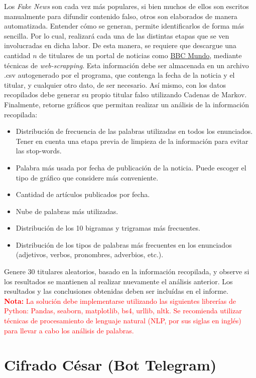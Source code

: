 Los \textit{Fake News} son cada vez más populares, si bien muchos de ellos son escritos manualmente para difundir contenido falso, otros son elaborados de manera automatizada. Entender cómo se generan, permite identificarlos de forma más sencilla. Por lo cual, realizará cada una de las distintas etapas que se ven involucradas en dicha labor. 
De esta manera, se requiere que descargue una cantidad $n$ de titulares de un portal de noticias como \textcolor{cyan}{\href{https://www.bbc.com/mundo/topics/c67q9nnn8z7t}{BBC Mundo}}, mediante técnicas de \textit{web-scrapping}. Esta información debe ser almacenada en un archivo .csv autogenerado por el programa, que contenga la fecha de la noticia y el titular, y cualquier otro dato, de ser necesario. Así mismo, con los datos recopilados debe generar su propio titular falso utilizando Cadenas de Markov. Finalmente, retorne gráficos que permitan realizar un análisis de la información recopilada:
\begin{itemize}
    \item Distribución de frecuencia de las palabras utilizadas en todos los enunciados. Tener en cuenta una etapa previa de limpieza de la información para evitar las stop-words.
    \item Palabra más usada por fecha de publicación de la noticia. Puede escoger el tipo de gráfico que considere más conveniente.
    \item Cantidad de artículos publicados por fecha.
    \item Nube de palabras más utilizadas.
    \item Distribución de los 10 bigramas y trigramas más frecuentes.
    \item Distribución de los tipos de palabras más frecuentes en los enunciados (adjetivos, verbos, pronombres, adverbios, etc.).
\end{itemize}
Genere 30 titulares aleatorios, basado en la información recopilada, y observe si los resultados se mantienen al realizar nuevamente el análisis anterior. Los resultados y las conclusiones obtenidas deben ser incluídas en el informe.
\\

\textcolor{red}{\textbf{Nota:} La solución debe implementarse utilizando las siguientes librerías de Python: Pandas, seaborn, matplotlib, bs4, urllib, nltk. Se recomienda utilizar técnicas de procesamiento de lenguaje natural (NLP, por sus siglas en inglés) para llevar a cabo los análisis de palabras.}

\newpage
\section{Cifrado César (Bot Telegram)}

